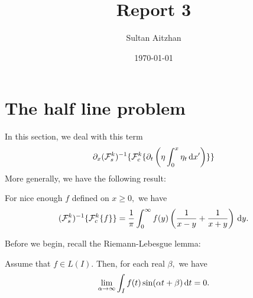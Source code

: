 \documentclass[10pt,reqno,oneside,a4paper, landscape]{article}
\author{Sultan Aitzhan}
\title{Report 3}
\date{\today}
\begin{document}
\maketitle
\thispagestyle{fancy}
\tableofcontents

\section{The half line problem}
In this section, we deal with this term 
\[ 
\partial_x(\mathcal{F}^k_s)^{-1} \{ \mathcal{F}^k_c \{ \partial_t \left( \eta \int^{x}_0\eta_{t} \,\mathrm{d} x' \right)\} \}
\]
More generally, we have the following result:
\begin{thm}
For nice enough $f$ defined on $x\geq 0,$ we have
\[ 
(\mathcal{F}^k_s)^{-1} \{ \mathcal{F}^k_c \{ f \} \} = \frac{1}{\pi} \int^{\infty}_0 f(y) \left( \frac{1}{x-y} + \frac{1}{x+y} \right) \,\mathrm{d} y.
\]
\end{thm}
Before we begin, recall the Riemann-Lebesgue lemma:
\begin{lem}
Assume that $f \in L(I).$ Then, for each real $\beta,$ we have 
\[\lim_{\alpha\to\infty} \int_I f(t) \sin(\alpha t + \beta) \,\mathrm{d} t = 0.\]
\end{lem}
\end{document}
